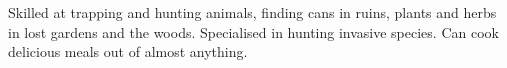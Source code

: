 \newpage
\begin{npcBox}[title=Gutenberg continued]
    
    \begin{stressSection}
    \end{stressSection}
    \begin{tabularx}{\textwidth}{ XX }
    \end{tabularx}
    
    \begin{consequences}
    \item {}
    \item {}
    \item {}
    \end{consequences}
    
    \begin{npcDescription}
    Skilled at trapping and hunting animals, finding cans in ruins, plants and herbs in lost gardens and the woods. Specialised in hunting invasive species. Can cook delicious meals out of almost anything.
    \end{npcDescription}
    
\end{npcBox}



